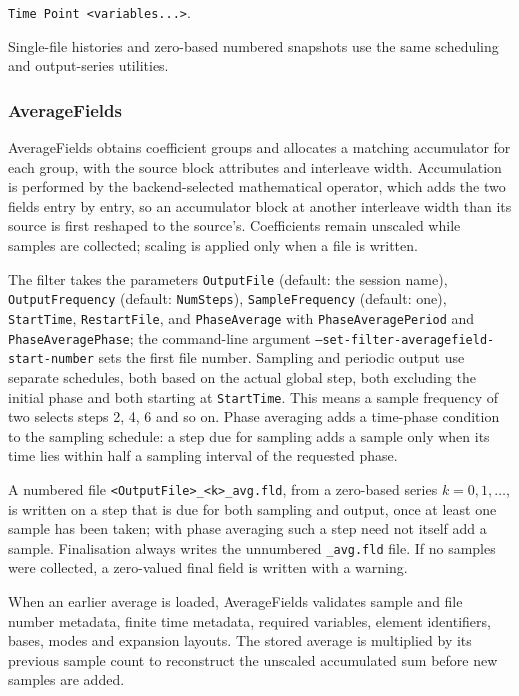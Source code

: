 \begin{center}
\texttt{Time Point <variables...>}.
\end{center}

Single-file histories and zero-based numbered snapshots use the same scheduling
and output-series utilities.

\subsubsection{AverageFields}

AverageFields obtains coefficient groups and allocates a matching accumulator
for each group, with the source block attributes and interleave width.
Accumulation is performed by the backend-selected mathematical operator, which
adds the two fields entry by entry, so an accumulator block at another
interleave width than its source is first reshaped to the source's.
Coefficients remain unscaled while samples are collected; scaling is applied
only when a file is written.

The filter takes the parameters \texttt{OutputFile} (default: the session
name), \texttt{OutputFrequency} (default: \texttt{NumSteps}),
\texttt{SampleFrequency} (default: one), \texttt{StartTime},
\texttt{RestartFile}, and \texttt{PhaseAverage} with
\texttt{PhaseAveragePeriod} and \texttt{PhaseAveragePhase}; the command-line
argument \texttt{--set-filter-averagefield-start-number} sets the first file
number. Sampling and periodic output use separate schedules, both based on the
actual global step, both excluding the initial phase and both starting at
\texttt{StartTime}. This means a sample frequency of two selects steps 2, 4, 6
and so on. Phase averaging adds a time-phase condition to the sampling
schedule: a step due for sampling adds a sample only when its time lies within
half a sampling interval of the requested phase.

A numbered file \texttt{<OutputFile>\_<k>\_avg.fld}, from a zero-based series
$k = 0, 1, \ldots$, is written on a step that is due for both sampling and
output, once at least one sample has been taken; with phase averaging such a
step need not itself add a sample. Finalisation always writes the unnumbered
\texttt{\_avg.fld} file. If no samples were collected, a zero-valued final
field is written with a warning.

When an earlier average is loaded, AverageFields validates sample and file
number metadata, finite time metadata, required variables, element identifiers,
bases, modes and expansion layouts. The stored average is multiplied by its
previous sample count to reconstruct the unscaled accumulated sum before new
samples are added.

